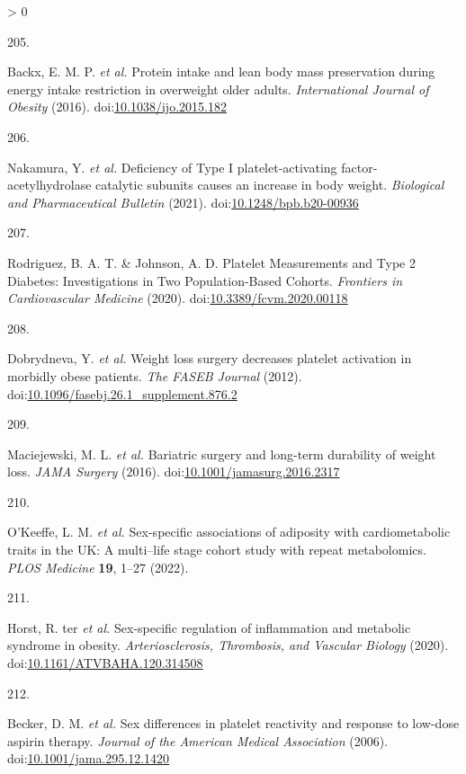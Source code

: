 \documentclass[11pt,twoside]{bristolthesis}
\newlength{\cslhangindent}
\newlength{\csllabelwidth}
\newenvironment{CSLReferences}[2] %
 {%
  \setlength{\parindent}{0pt}
  \ifodd #1 \everypar{\setlength{\hangindent}{\cslhangindent}}\ignorespaces\fi
  \ifnum #2 > 0
  \setlength{\parskip}{#2\baselineskip}
  \fi
 }%
 {}
\newcommand{\CSLLeftMargin}[1]{\parbox[t]{\csllabelwidth}{#1}}
\newcommand{\CSLRightInline}[1]{\parbox[t]{\linewidth - \csllabelwidth}{#1}\break}
\begin{document}
\begin{CSLReferences}{0}{0}
\leavevmode\hypertarget{ref-Backx2016}{}%
\CSLLeftMargin{205. }
\CSLRightInline{Backx, E. M. P. \emph{et al.} {Protein intake and lean body mass preservation during energy intake restriction in overweight older adults}. \emph{International Journal of Obesity} (2016). doi:\href{https://doi.org/10.1038/ijo.2015.182}{10.1038/ijo.2015.182}}

\leavevmode\hypertarget{ref-Nakamura2021}{}%
\CSLLeftMargin{206. }
\CSLRightInline{Nakamura, Y. \emph{et al.} {Deficiency of Type I platelet-activating factor-acetylhydrolase catalytic subunits causes an increase in body weight}. \emph{Biological and Pharmaceutical Bulletin} (2021). doi:\href{https://doi.org/10.1248/bpb.b20-00936}{10.1248/bpb.b20-00936}}

\leavevmode\hypertarget{ref-Rodriguez2020}{}%
\CSLLeftMargin{207. }
\CSLRightInline{Rodriguez, B. A. T. \& Johnson, A. D. {Platelet Measurements and Type 2 Diabetes: Investigations in Two Population-Based Cohorts}. \emph{Frontiers in Cardiovascular Medicine} (2020). doi:\href{https://doi.org/10.3389/fcvm.2020.00118}{10.3389/fcvm.2020.00118}}

\leavevmode\hypertarget{ref-Dobrydneva2012}{}%
\CSLLeftMargin{208. }
\CSLRightInline{Dobrydneva, Y. \emph{et al.} {Weight loss surgery decreases platelet activation in morbidly obese patients}. \emph{The FASEB Journal} (2012). doi:\href{https://doi.org/10.1096/fasebj.26.1_supplement.876.2}{10.1096/fasebj.26.1\_supplement.876.2}}

\leavevmode\hypertarget{ref-Maciejewski2016}{}%
\CSLLeftMargin{209. }
\CSLRightInline{Maciejewski, M. L. \emph{et al.} {Bariatric surgery and long-term durability of weight loss}. \emph{JAMA Surgery} (2016). doi:\href{https://doi.org/10.1001/jamasurg.2016.2317}{10.1001/jamasurg.2016.2317}}

\leavevmode\hypertarget{ref-OKeeffe2022}{}%
\CSLLeftMargin{210. }
\CSLRightInline{O'Keeffe, L. M. \emph{et al.} {Sex-specific associations of adiposity with cardiometabolic traits in the UK: A multi--life stage cohort study with repeat metabolomics}. \emph{PLOS Medicine} \textbf{19}, 1--27 (2022).}

\leavevmode\hypertarget{ref-TerHorst2020}{}%
\CSLLeftMargin{211. }
\CSLRightInline{Horst, R. ter \emph{et al.} {Sex-specific regulation of inflammation and metabolic syndrome in obesity}. \emph{Arteriosclerosis, Thrombosis, and Vascular Biology} (2020). doi:\href{https://doi.org/10.1161/ATVBAHA.120.314508}{10.1161/ATVBAHA.120.314508}}

\leavevmode\hypertarget{ref-Becker2006}{}%
\CSLLeftMargin{212. }
\CSLRightInline{Becker, D. M. \emph{et al.} {Sex differences in platelet reactivity and response to low-dose aspirin therapy}. \emph{Journal of the American Medical Association} (2006). doi:\href{https://doi.org/10.1001/jama.295.12.1420}{10.1001/jama.295.12.1420}}


\end{CSLReferences}
\end{document}
